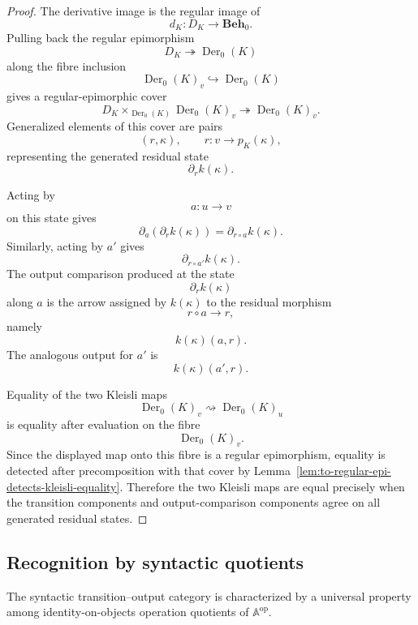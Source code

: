 \begin{proof}
    The derivative image is the regular image of
    \[
        d_K:D_K\to\mathbf{Beh}_0.
    \]
    Pulling back the regular epimorphism
    \[
        D_K\twoheadrightarrow \operatorname{Der}_0(K)
    \]
    along the fibre inclusion
    \[
        \operatorname{Der}_0(K)_v
        \hookrightarrow
        \operatorname{Der}_0(K)
    \]
    gives a regular-epimorphic cover
    \[
        D_K\times_{\operatorname{Der}_0(K)}
        \operatorname{Der}_0(K)_v
        \twoheadrightarrow
        \operatorname{Der}_0(K)_v.
    \]
    Generalized elements of this cover are pairs
    \[
        (r,\kappa),
        \qquad
        r:v\to p_K(\kappa),
    \]
    representing the generated residual state
    \[
        \partial_r k(\kappa).
    \]

    Acting by
    \[
        a:u\to v
    \]
    on this state gives
    \[
        \partial_a(\partial_r k(\kappa))
        =
        \partial_{r\circ a}k(\kappa).
    \]
    Similarly, acting by \(a'\) gives
    \[
        \partial_{r\circ a'}k(\kappa).
    \]
    The output comparison produced at the state
    \[
        \partial_r k(\kappa)
    \]
    along \(a\) is the arrow assigned by \(k(\kappa)\) to the residual
    morphism
    \[
        r\circ a\to r,
    \]
    namely
    \[
        k(\kappa)(a,r).
    \]
    The analogous output for \(a'\) is
    \[
        k(\kappa)(a',r).
    \]

    Equality of the two Kleisli maps
    \[
        \operatorname{Der}_0(K)_v
        \rightsquigarrow
        \operatorname{Der}_0(K)_u
    \]
    is equality after evaluation on the fibre
    \[
        \operatorname{Der}_0(K)_v.
    \]
    Since the displayed map onto this fibre is a regular epimorphism, equality
    is detected after precomposition with that cover by
    Lemma~\ref{lem:to-regular-epi-detects-kleisli-equality}. Therefore the two
    Kleisli maps are equal precisely when the transition components and
    output-comparison components agree on all generated residual states.
\end{proof}


\subsection{Recognition by syntactic quotients}
\label{subsec:to-recognition-by-syntactic-quotients}

The syntactic transition--output category is characterized by a universal
property among identity-on-objects operation quotients of \(\mathbb A^{\mathrm{op}}\).


